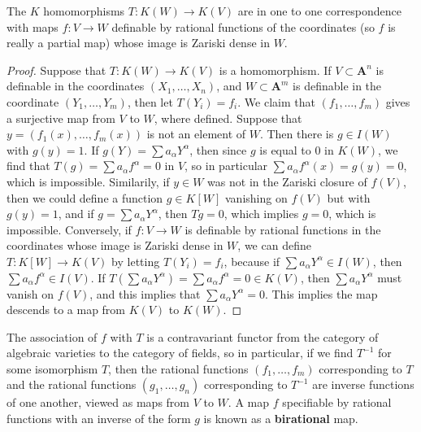 \begin{theorem}
    The $K$ homomorphisms $T: K(W) \to K(V)$ are in one to one correspondence with maps $f: V \to W$ definable by rational functions of the coordinates (so $f$ is really a partial map) whose image is Zariski dense in $W$.
\end{theorem}
\begin{proof}
    Suppose that $T: K(W) \to K(V)$ is a homomorphism. If $V \subset \mathbf{A}^n$ is definable in the coordinates $(X_1, \dots, X_n)$, and $W \subset \mathbf{A}^m$ is definable in the coordinate $(Y_1, \dots, Y_m)$, then let $T(Y_i) = f_i$. We claim that $(f_1, \dots, f_m)$ gives a surjective map from $V$ to $W$, where defined. Suppose that $y = (f_1(x), \dots, f_m(x))$ is not an element of $W$. Then there is $g \in I(W)$ with $g(y) = 1$. If $g(Y) = \sum a_\alpha Y^\alpha$, then since $g$ is equal to 0 in $K(W)$, we find that $T(g) = \sum a_\alpha f^\alpha = 0$ in $V$, so in particular $\sum a_\alpha f^\alpha(x) = g(y) = 0$, which is impossible. Similarily, if $y \in W$ was not in the Zariski closure of $f(V)$, then we could define a function $g \in K[W]$ vanishing on $f(V)$ but with $g(y) = 1$, and if $g = \sum a_\alpha Y^\alpha$, then $Tg = 0$, which implies $g = 0$, which is impossible. Conversely, if $f: V \to W$ is definable by rational functions in the coordinates whose image is Zariski dense in $W$, we can define $T: K[W] \to K(V)$ by letting $T(Y_i) = f_i$, because if $\sum a_\alpha Y^\alpha \in I(W)$, then $\sum a_\alpha f^\alpha \in I(V)$. If $T(\sum a_\alpha Y^\alpha) = \sum a_\alpha f^\alpha = 0 \in K(V)$, then $\sum a_\alpha Y^\alpha$ must vanish on $f(V)$, and this implies that $\sum a_\alpha Y^\alpha = 0$. This implies the map descends to a map from $K(V)$ to $K(W)$.
\end{proof}

The association of $f$ with $T$ is a contravariant functor from the category of algebraic varieties to the category of fields, so in particular, if we find $T^{-1}$ for some isomorphism $T$, then the rational functions $(f_1, \dots, f_m)$ corresponding to $T$ and the rational functions $(g_1, \dots, g_n)$ corresponding to $T^{-1}$ are inverse functions of one another, viewed as maps from $V$ to $W$. A map $f$ specifiable by rational functions with an inverse of the form $g$ is known as a {\bf birational} map.

